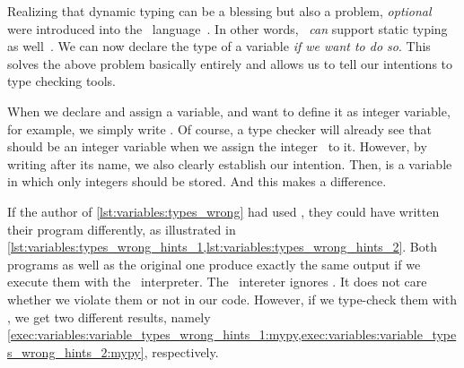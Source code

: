 Realizing that dynamic typing can be a blessing but also a problem, \emph{optional}  were introduced into the \python\ language~\cite{PEP484,R2023PTHATCPBNI}.
In other words, \python\ \emph{can} support static typing as well~\cite{PSF:STWP}.
We can now declare the type of a variable \emph{if we want to do so}.
This solves the above problem basically entirely and allows us to tell our intentions to type checking tools.

When we declare and assign a variable,  and want to define it as integer variable, for example, we simply write .
Of course, a type checker will already see that  should be an integer variable when we assign the integer~ to it.
However, by writing \pythonIdx{:} after its name, we also clearly establish our intention.
Then,  is a variable in which only integers should be stored.
And this makes a difference.

%
%
%
%
%
%
%
%
%

If the author of \cref{lst:variables:types_wrong} had used , they could have written their program differently, as illustrated in \cref{lst:variables:types_wrong_hints_1,lst:variables:types_wrong_hints_2}.
Both programs as well as the original one produce exactly the same output if we execute them with the \python\ interpreter.
The \python\ intereter ignores .
It does not care whether we violate them or not in our code.
However, if we type-check them with \mypy, we get two different results, namely \cref{exec:variables:variable_types_wrong_hints_1:mypy,exec:variables:variable_types_wrong_hints_2:mypy}, respectively.


